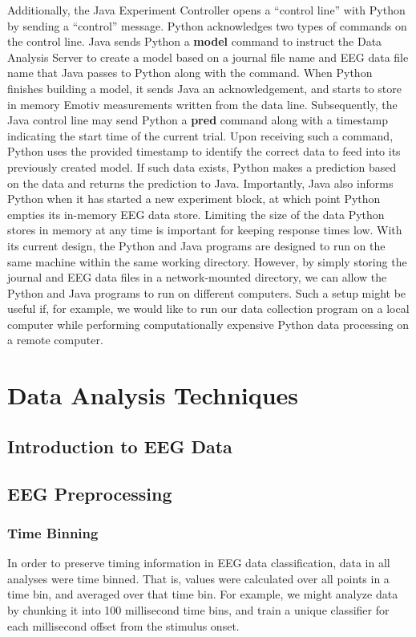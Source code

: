\documentclass[12pt]{report}
\begin{document}
	Additionally, the Java Experiment Controller opens a ``control line'' with Python by sending a ``control'' message.  Python acknowledges two types of commands on the control line.  Java sends Python a {\bf model} command to instruct the Data Analysis Server to create a model based on a journal file name and EEG data file name that Java passes to Python along with the command.  When Python finishes building a model, it sends Java an acknowledgement, and starts to store in memory Emotiv measurements written from the data line.  Subsequently, the Java control line may send Python a {\bf pred} command along with a timestamp indicating the start time of the current trial.  Upon receiving such a command, Python uses the provided timestamp to identify the correct data to feed into its previously created model.  If such data exists, Python makes a prediction based on the data and returns the prediction to Java.  Importantly, Java also informs Python when it has started a new experiment block, at which point Python empties its in-memory EEG data store.  Limiting the size of the data Python stores in memory at any time is important for keeping response times low.  
	With its current design, the Python and Java programs are designed to run on the same machine within the same working directory.  However, by simply storing the journal and EEG data files in a network-mounted directory, we can allow the Python and Java programs to run on different computers.  Such a setup might be useful if, for example, we would like to run our data collection program on a local computer while performing computationally expensive Python data processing on a remote computer.


\chapter{Data Analysis Techniques \label{dataanalysis}}

\section{Introduction to EEG Data}
\section{EEG Preprocessing}


\subsection{Time Binning}
	In order to preserve timing information in EEG data classification, data in all analyses were time binned.  That is, values were calculated over all points in a time bin, and averaged over that time bin.  For example, we might analyze data by chunking it into 100 millisecond time bins, and train a unique classifier for each millisecond offset from the stimulus onset.
	
\end{document}
